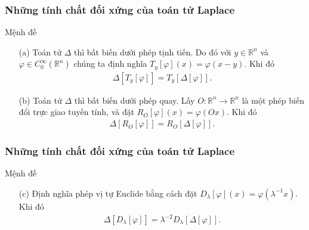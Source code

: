 \documentclass[11pt]{beamer}
\numberwithin{equation}{section}
\theoremstyle{plain}
\theoremstyle{definition}
\theoremstyle{remark}
\begin{document}
\begin{frame}\frametitle{Những tính chất đối xứng của toán tử Laplace}
\begin{block}{Mệnh đề}
\begin{itemize}
\item[(a)] Toán tử $\Delta$ thì bất biến dưới phép tịnh tiến. Do đó với $y\in \mathbb{R}^{n}$ và $\varphi\in C_{0}^{\infty}\left(\mathbb{R}^{n}\right)$ chúng ta định nghĩa $T_{y}\left[\varphi\right]\left(x\right)=\varphi\left(x-y\right)$. Khi đó 
\begin{align*}
\Delta \left[ {{T_y}\left[ \varphi  \right]} \right] = {T_y}\left[ {\Delta \left[ \varphi  \right]} \right].
\end{align*}
\item[(b)] Toán tử $\Delta$ thì bất biến dưới phép quay. Lấy $O:\mathbb{R}^{n}\to\mathbb{R}^{n}$ là một phép biến đổi trực giao tuyến tính, và đặt $R_{O}\left[\varphi\right]\left(x\right)=\varphi\left(Ox\right)$. Khi đó 
\begin{align*}
\Delta \left[ {{R_O}\left[ \varphi  \right]} \right] = {R_O}\left[ {\Delta \left[ \varphi  \right]} \right].
\end{align*}
\end{itemize}
\end{block}
\end{frame}
\begin{frame}\frametitle{Những tính chất đối xứng của toán tử Laplace}
\begin{block}{Mệnh đề}
\begin{itemize}
\item[(c)] Định nghĩa phép vị tự Euclide bằng cách đặt ${D_\lambda }\left[ \varphi  \right]\left( x \right) = \varphi \left( {{\lambda ^{ - 1}}x} \right).$ Khi đó
\begin{align*}
\Delta \left[ {{D_\lambda }\left[ \varphi  \right]} \right] = {\lambda ^{ - 2}}{D_\lambda }\left[ {\Delta \left[ \varphi  \right]} \right].
\end{align*}
\end{itemize}
\end{block}
\end{frame}
\end{document}
